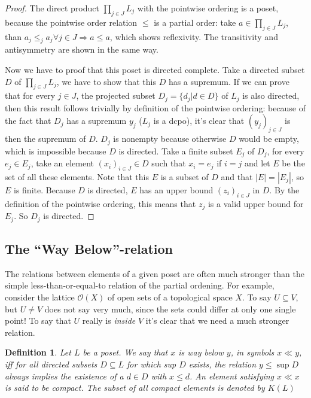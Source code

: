 \documentclass[a4paper,12pt]{article}
\newtheorem{definition}[theorem]{Definition}
\begin{document}
\begin{proof}
The direct product  $\prod_{j\in J}L_j$  with the pointwise ordering is a poset, because the pointwise order relation $\leq$ is a partial order: take $a \in \prod_{j\in J}L_j$, than $a_j \leq_j a_j \forall j \in J \Rightarrow a \leq a$, which shows reflexivity. The transitivity and antisymmetry are shown in the same way.

Now we have to proof that this poset is directed complete. Take a directed subset $D$ of $\prod_{j\in J}L_j$, we have to show that this $D$ has a supremum. If we can prove that for every $j \in J$, the projected subset $D_j = \{d_j | d \in D\}$ of $L_j$ is also directed, then this result follows trivially by definition of the pointwise ordering: because of the fact that $D_j$ has a supremum $y_j$ ($L_j$ is a dcpo), it's clear that $(y_j)_{j \in J}$ is then the supremum of $D$. $D_j$ is nonempty because otherwise $D$ would be empty, which is impossible because $D$ is directed. Take a finite subset $E_j$ of $D_j$, for every $e_j \in E_j$, take an element $(x_i)_{i \in J} \in D$ such that $x_i = e_j$ if $i = j$ and let $E$ be the set of all these elements. Note that this $E$ is a subset of $D$ and that $|E| = |E_j|$, so $E$ is finite. Because $D$ is directed, $E$ has an upper bound $(z_i)_{i \in J}$ in $D$. By the definition of the pointwise ordering, this means that $z_j$ is a valid upper bound for $E_j$. So $D_j$ is directed.
\end{proof}


\subsection{The ``Way Below''-relation}\label{waybelow}
The relations between elements of a given poset are often much stronger than the simple less-than-or-equal-to relation of the partial ordening. For example, consider the lattice $\mathcal{O}(X)$ of open sets of a topological space $X$. To say $U \subseteq V$, but $U \neq V$ does not say very much, since the sets could differ at only one single point! To say that $U$ really is \emph{inside} $V$ it's clear that we need a much stronger relation. 

\begin{definition}
Let $L$ be a poset. We say that $x$ \emph{is way below} $y$, in symbols $x \ll  y$, iff for all directed subsets $D \subseteq L$ for which sup $D$ exists, the relation $y \leq \sup D$ always implies the existence of a $d \in D$ with $x \leq d$. An element satisfying $x \ll x$  is said to be \emph{compact}. The \emph{subset of all compact elements} is denoted by $K(L)$
\end{definition}
\end{document}
